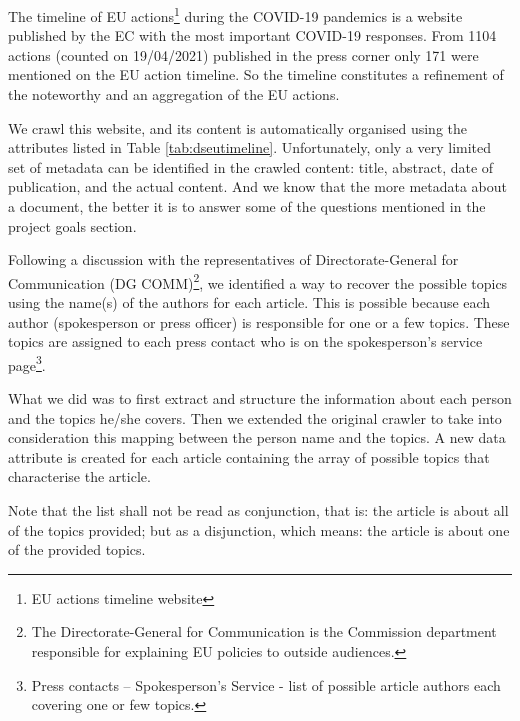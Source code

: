 The timeline of EU actions\footnote{ EU actions timeline website } during the COVID-19 pandemics is a website published by the EC with the most important COVID-19 responses. From 1104 actions (counted on 19/04/2021) published in the press corner only 171 were mentioned on the EU action timeline. So the timeline constitutes a refinement of the noteworthy and an aggregation of the EU actions. 

We crawl this website, and its content is automatically organised using the attributes listed in  Table \ref{tab:dseutimeline}. Unfortunately, only a very limited set of metadata can be identified in the crawled content: title, abstract, date of publication, and the actual content. And we know that the more metadata about a document, the better it is to answer some of the questions mentioned in the project goals section.

Following a discussion with the representatives of Directorate-General for Communication (DG COMM)\footnote{ The Directorate-General for Communication is the Commission department responsible for explaining EU policies to outside audiences. }, we identified a way to recover the possible topics using the name(s) of the authors for each article. This is possible because each author (spokesperson or press officer) is responsible for one or a few topics. These topics are assigned to each press contact who is on the spokesperson's service page\footnote{ Press contacts – Spokesperson's Service - list of possible article authors each covering one or few topics.}. 

What we did was to first extract and structure the information about each person and the topics he/she covers. Then we extended the original crawler to take into consideration this mapping between the person name and the topics. A new data attribute is created for each article containing the array of possible topics that characterise the article. 

Note that the list shall not be read as conjunction, that is: the article is about all of the topics provided; but as a disjunction, which means: the article is about one of the provided topics. 

